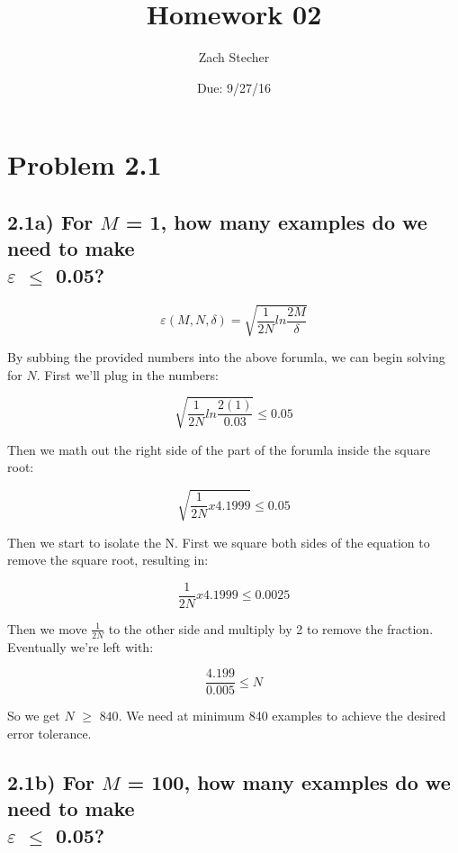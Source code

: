 \documentclass[11pt]{article}
\title{Homework 02}
\author{Zach Stecher}
\date{Due: 9/27/16}
\begin{document}
\maketitle

\section*{Problem 2.1}
\subsection*{2.1a)  For $M$ = 1, how many examples do we need to make \\ $\varepsilon$ $\leq$ 0.05?}

\begin{equation*}
\varepsilon(M, N, \delta) = \sqrt{\frac{1}{2N}ln\frac{2M}{\delta}}
\end{equation*}

By subbing the provided numbers into the above forumla, we can begin solving for $N$. First we'll plug in the numbers:

\begin{equation*}
\sqrt{\frac{1}{2N}ln\frac{2(1)}{0.03}} \leq 0.05
\end{equation*}

Then we math out the right side of the part of the forumla inside the square root:

\begin{equation*}
\sqrt{\frac{1}{2N} x 4.1999} \leq 0.05
\end{equation*}

Then we start to isolate the N. First we square both sides of the equation to remove the square root, resulting in:

\begin{equation*}
\frac{1}{2N} x 4.1999 \leq 0.0025
\end{equation*}

Then we move $\frac{1}{2N}$ to the other side and multiply by 2 to remove the fraction. Eventually we're left with:

\begin{equation*}
\frac{4.199}{0.005} \leq N
\end{equation*}

So we get $N$ $\geq$ $840$. We need at minimum 840 examples to achieve the desired error tolerance.

\subsection*{2.1b)  For $M$ = 100, how many examples do we need to make \\ $\varepsilon$ $\leq$ 0.05?}
\end{document}
